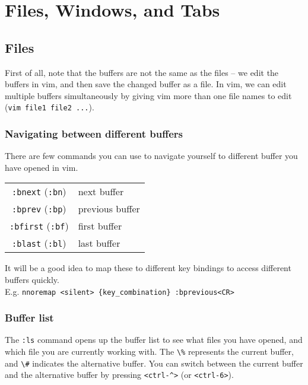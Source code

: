 \chapter{Files, Windows, and Tabs}

\section{Files}

First of all, note that the buffers are not the same as the files -- we edit the buffers in vim, and then save the changed buffer as a file.
In vim, we can edit multiple buffers simultaneously by giving vim more than one file names to edit (\verb|vim file1 file2 ...|).

\subsection{Navigating between different buffers}

There are few commands you can use to navigate yourself to different buffer you have opened in vim.
\newline

\begin{tabular}{c|l}
    \verb|:bnext| (\verb|:bn|)  & next buffer\\
    \verb|:bprev| (\verb|:bp|)  & previous buffer\\
    \verb|:bfirst| (\verb|:bf|) & first buffer\\
    \verb|:blast| (\verb|:bl|)  & last buffer\\
\end{tabular}
\newline

It will be a good idea to map these to different key bindings to access different buffers quickly.\\
E.g. \verb|nnoremap <silent> {key_combination} :bprevious<CR>|

\subsection{Buffer list}

The \verb|:ls| command opens up the buffer list to see what files you have opened, and which file you are currently working with.
The \verb|\%| represents the current buffer, and \verb|\#| indicates the alternative buffer.
You can switch between the current buffer and the alternative buffer by pressing \verb|<ctrl-^>| (or \verb|<ctrl-6>|).

